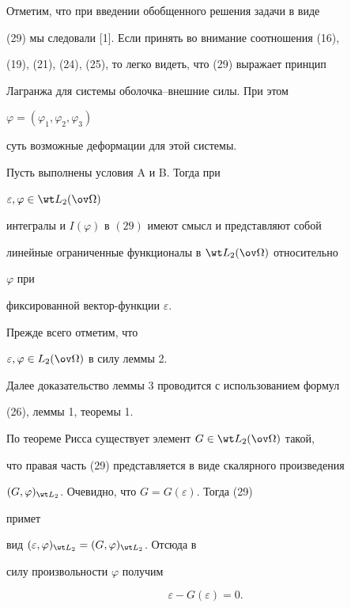  


Отметим, что при введении обобщенного решения задачи в виде 


(29) мы следовали [1]. Если принять во внимание соотношения (16), 


(19), (21), (24), (25), то легко видеть, что (29) выражает принцип 


Лагранжа для системы оболочка--внешние силы. При этом 


$\varphi=(\varphi_1,\varphi_2,\varphi_3)$ 


суть возможные деформации для этой системы. 


 


\begin{lem} Пусть выполнены условия {\rom A} и {\rom B}. Тогда при 


$\varepsilon,\varphi\in\wt L_2(\ov\Omega)$ 


интегралы и $I(\varphi)$ в $(29)$ имеют смысл и представляют собой 


линейные ограниченные функционалы в $\wt L_2(\ov\Omega)$ относительно 


$\varphi$ при 


фиксированной вектор-функции $\varepsilon$. 


\end{lem} 


 


Прежде всего отметим, что 


$\varepsilon,\varphi\in L_2(\ov\Omega)$ в силу леммы 2. 


Далее доказательство леммы 3 проводится с использованием формул 


(26), леммы 1, теоремы 1. 


 


По теореме Рисса существует элемент $G\in\wt L_2(\ov\Omega)$ такой, 


что правая часть (29) представляется в виде скалярного произведения 


$(G,\varphi)_{\wt L_2}$. Очевидно, что $G=G(\varepsilon)$. Тогда (29) 


примет 


вид $(\varepsilon,\varphi)_{\wt L_2}=(G,\varphi)_{\wt L_2}$. Отсюда в 


силу произвольности $\varphi$ получим 


\begin{equation} 


\varepsilon-G(\varepsilon)=0. 


\end{equation} 


